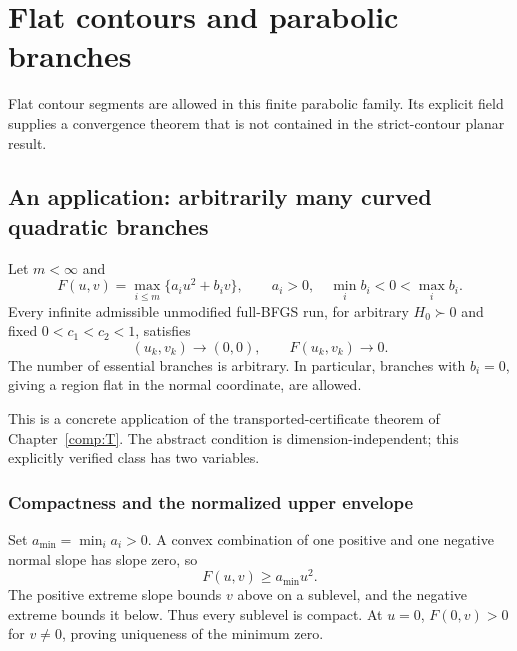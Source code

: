 \chapter{Flat contours and parabolic branches}\label{comp:Q}\label{Q:chapter}
\renewcommand{\ModuleTag}{10}
Flat contour segments are allowed in this finite parabolic family. Its explicit field supplies a convergence theorem that is not contained in the strict-contour planar result.


\begingroup
\providecommand{\R}{}
\renewcommand{\R}{\mathbb R}
\providecommand{\tr}{}
\renewcommand{\tr}{\operatorname{tr}}
\providecommand{\diag}{}
\renewcommand{\diag}{\operatorname{diag}}
\providecommand{\Span}{}
\renewcommand{\Span}{\operatorname{span}}
\providecommand{\ip}{}
\renewcommand{\ip}[2]{\langle #1,#2\rangle}
\providecommand{\norm}{}
\renewcommand{\norm}[1]{\lVert #1\rVert}
\providecommand{\T}{}
\renewcommand{\T}{^{\mathsf T}}
\providecommand{\D}{}
\renewcommand{\D}{\mathcal D}
\setcounter{section}{4}
\setcounter{theorem}{1}
\setcounter{lemma}{0}
\setcounter{corollary}{0}
\setcounter{proposition}{0}
\setcounter{remark}{0}
\setcounter{equation}{6}


\section{An application: arbitrarily many curved quadratic branches}

\begin{theorem}
Let $m<\infty$ and
\[
 F(u,v)=\max_{i\le m}\{a_i u^2+b_i v\},\qquad
 a_i>0,\quad\min_i b_i<0<\max_i b_i.
\]
Every infinite admissible unmodified full-BFGS run, for arbitrary $H_0\succ0$ and fixed $0<c_1<c_2<1$, satisfies
\[
 (u_k,v_k)\to(0,0),\qquad F(u_k,v_k)\to0.
\]
The number of essential branches is arbitrary. In particular, branches with $b_i=0$, giving a region flat in the normal coordinate, are allowed.
\end{theorem}
This is a concrete application of the transported-certificate theorem of Chapter~\ref{comp:T}. The abstract condition is dimension-independent; this explicitly verified class has two variables.



\subsection{Compactness and the normalized upper envelope}
Set $a_{\min}=\min_i a_i>0$. A convex combination of one positive and one negative normal slope has slope zero, so
\[
 F(u,v)\ge a_{\min}u^2.
\]
The positive extreme slope bounds $v$ above on a sublevel, and the negative extreme bounds it below. Thus every sublevel is compact. At $u=0$, $F(0,v)>0$ for $v\ne0$, proving uniqueness of the minimum zero.

